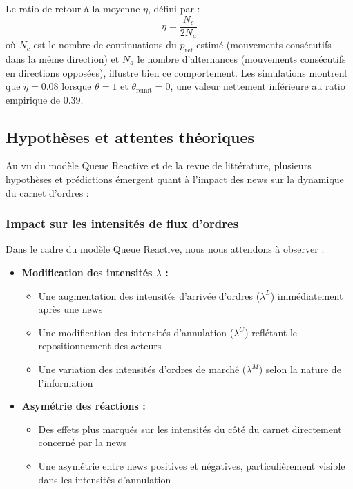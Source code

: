 \documentclass[12pt,a4paper]{article}
\theoremstyle{definition}
\theoremstyle{remark}
\begin{document}
    Le ratio de retour à la moyenne $\eta$, défini par :
    $$\eta = \frac{N_c}{2N_a}$$
    où $N_c$ est le nombre de continuations du $p_{\text{ref}}$ estimé (mouvements consécutifs dans la même direction) et $N_a$ le nombre d'alternances (mouvements consécutifs en directions opposées), illustre bien ce comportement. Les simulations montrent que $\eta = 0.08$ lorsque $\theta = 1$ et $\theta_{\text{reinit}} = 0$, une valeur nettement inférieure au ratio empirique de $0.39$.

    \subsection{Hypothèses et attentes théoriques}

    Au vu du modèle Queue Reactive et de la revue de littérature, plusieurs hypothèses et prédictions émergent quant à l'impact des news sur la dynamique du carnet d'ordres :

    \subsubsection{Impact sur les intensités de flux d'ordres}

    Dans le cadre du modèle Queue Reactive, nous nous attendons à observer :

    \begin{itemize}
        \item \textbf{Modification des intensités $\lambda$ :}
        \begin{itemize}
            \item Une augmentation des intensités d'arrivée d'ordres ($\lambda^L$) immédiatement après une news
            \item Une modification des intensités d'annulation ($\lambda^C$) reflétant le repositionnement des acteurs
            \item Une variation des intensités d'ordres de marché ($\lambda^M$) selon la nature de l'information
        \end{itemize}
        
        \item \textbf{Asymétrie des réactions :}
        \begin{itemize}
            \item Des effets plus marqués sur les intensités du côté du carnet directement concerné par la news
            \item Une asymétrie entre news positives et négatives, particulièrement visible dans les intensités d'annulation
        \end{itemize}
    \end{itemize}
\end{document}
